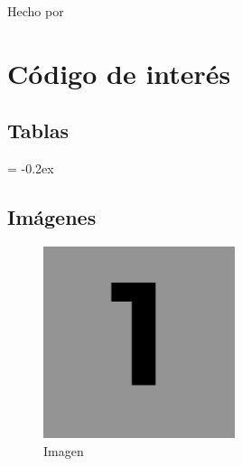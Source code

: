 
Hecho por \cite{aruznieto}

\chapter{Código de interés} \label{ch:código}

\section{Tablas} \label{sec:tablas}
    \begin{table}[H]
    \small
      \centering
        \extrarowheight = -0.2ex
        \renewcommand{\arraystretch}{1.75}
        \noindent{}
        \caption{Tabla}
      \label{tab:tabla}
    \end{table}

\section{Imágenes} \label{sec:imagenes}
    \begin{figure}[H]
    	\centering
    	\includegraphics[width=0.5\textwidth]{img/img1.png}
    	\caption{Imagen}
    	\label{fig:imagen}
    \end{figure}


